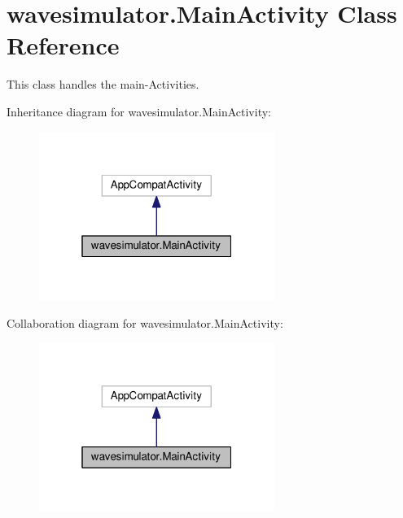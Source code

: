 \hypertarget{classwavesimulator_1_1MainActivity}{}\section{wavesimulator.\+Main\+Activity Class Reference}
\label{classwavesimulator_1_1MainActivity}


This class handles the main-\/\+Activities.  




Inheritance diagram for wavesimulator.\+Main\+Activity\+:\nopagebreak
\begin{figure}[H]
\begin{center}
\leavevmode
\includegraphics[width=217pt]{classwavesimulator_1_1MainActivity__inherit__graph}
\end{center}
\end{figure}


Collaboration diagram for wavesimulator.\+Main\+Activity\+:\nopagebreak
\begin{figure}[H]
\begin{center}
\leavevmode
\includegraphics[width=217pt]{classwavesimulator_1_1MainActivity__coll__graph}
\end{center}
\end{figure}
